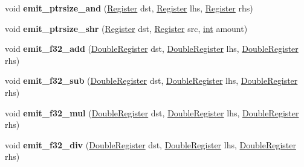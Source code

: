 \begin{DoxyCompactItemize}
void {\bfseries emit\+\_\+ptrsize\+\_\+and} (\mbox{\hyperlink{classv8_1_1internal_1_1Register}{Register}} dst, \mbox{\hyperlink{classv8_1_1internal_1_1Register}{Register}} lhs, \mbox{\hyperlink{classv8_1_1internal_1_1Register}{Register}} rhs)
\item 
\mbox{\label{classv8_1_1internal_1_1wasm_1_1LiftoffAssembler_a652fb6fee83d32d2b0496f602e22703c}} 
void {\bfseries emit\+\_\+ptrsize\+\_\+shr} (\mbox{\hyperlink{classv8_1_1internal_1_1Register}{Register}} dst, \mbox{\hyperlink{classv8_1_1internal_1_1Register}{Register}} src, \mbox{\hyperlink{classint}{int}} amount)
\item 
\mbox{\label{classv8_1_1internal_1_1wasm_1_1LiftoffAssembler_afa036318e083d2c753d55336114ec703}} 
void {\bfseries emit\+\_\+f32\+\_\+add} (\mbox{\hyperlink{classv8_1_1internal_1_1DoubleRegister}{Double\+Register}} dst, \mbox{\hyperlink{classv8_1_1internal_1_1DoubleRegister}{Double\+Register}} lhs, \mbox{\hyperlink{classv8_1_1internal_1_1DoubleRegister}{Double\+Register}} rhs)
\item 
\mbox{\label{classv8_1_1internal_1_1wasm_1_1LiftoffAssembler_abd3294d31944036836fcec9a52ecaa97}} 
void {\bfseries emit\+\_\+f32\+\_\+sub} (\mbox{\hyperlink{classv8_1_1internal_1_1DoubleRegister}{Double\+Register}} dst, \mbox{\hyperlink{classv8_1_1internal_1_1DoubleRegister}{Double\+Register}} lhs, \mbox{\hyperlink{classv8_1_1internal_1_1DoubleRegister}{Double\+Register}} rhs)
\item 
\mbox{\label{classv8_1_1internal_1_1wasm_1_1LiftoffAssembler_a21cfbf92565bd004145cf0147c635ec2}} 
void {\bfseries emit\+\_\+f32\+\_\+mul} (\mbox{\hyperlink{classv8_1_1internal_1_1DoubleRegister}{Double\+Register}} dst, \mbox{\hyperlink{classv8_1_1internal_1_1DoubleRegister}{Double\+Register}} lhs, \mbox{\hyperlink{classv8_1_1internal_1_1DoubleRegister}{Double\+Register}} rhs)
\item 
\mbox{\label{classv8_1_1internal_1_1wasm_1_1LiftoffAssembler_ac90cbf3a80a0d1369b0d5a14ec779004}} 
void {\bfseries emit\+\_\+f32\+\_\+div} (\mbox{\hyperlink{classv8_1_1internal_1_1DoubleRegister}{Double\+Register}} dst, \mbox{\hyperlink{classv8_1_1internal_1_1DoubleRegister}{Double\+Register}} lhs, \mbox{\hyperlink{classv8_1_1internal_1_1DoubleRegister}{Double\+Register}} rhs)

\end{DoxyCompactItemize}
